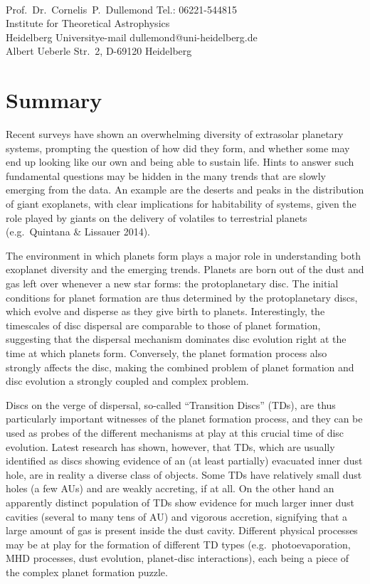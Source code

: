 \documentclass[10pt,fleqn,twoside]{article}
\begin{document}
\\
Prof.~Dr.~Cornelis~P.~Dullemond \hfill Tel.: 06221-544815\\
Institute for Theoretical Astrophysics\\
 Heidelberg University\hfill e-mail dullemond@uni-heidelberg.de\\
Albert Ueberle Str.\ 2, D-69120 Heidelberg\\


\pagebreak[4]

\fontsize{11}{12}\selectfont

\section{Summary}

Recent surveys have shown an overwhelming diversity of extrasolar
planetary systems, prompting the question of how did they form,
and whether some may end up
looking like our own and being able to sustain life. Hints to answer
such fundamental questions may be hidden in the many trends that are
slowly emerging from the data. An example are the deserts and peaks in the distribution of
giant exoplanets, with clear implications for habitability of systems,
given the role played by giants on the delivery of volatiles to
terrestrial planets (e.g.\ Quintana \& Lissauer 2014). 

The environment
in which planets form plays a major role in understanding both exoplanet
diversity and the emerging trends. Planets are
born out of the dust and gas left over whenever a new star forms: the
protoplanetary disc. The initial conditions for planet formation
are thus determined by the protoplanetary discs, which evolve and disperse as they
give birth to planets. Interestingly, the timescales of disc dispersal
are comparable to those of planet formation, suggesting that the
dispersal mechanism dominates disc evolution right at the time at
which planets form.  Conversely, the planet formation process also
strongly affects the disc, making the combined problem of planet formation
and disc evolution a strongly coupled and complex problem. 

Discs on the verge of dispersal, so-called ``Transition Discs'' (TDs),  are thus particularly important
witnesses of the planet formation process, and they can be used
as probes of the different mechanisms at play at this crucial time of
disc evolution. Latest research has shown, however, that TDs, which are usually
identified as discs showing evidence of an (at least partially)
evacuated inner dust hole, are in reality a diverse class of
objects. Some TDs have relatively small dust holes (a few AUs) and are
weakly accreting, if at all. On the other hand an apparently distinct
population of TDs show evidence for much larger inner dust cavities
(several to many tens of AU) and vigorous accretion, signifying that a
large amount of gas is present inside the dust cavity. Different
physical processes may be at play for the formation of different TD
types (e.g.\ photoevaporation, MHD processes, dust evolution, planet-disc interactions),
each being a piece of the complex planet formation puzzle. 
\end{document}
